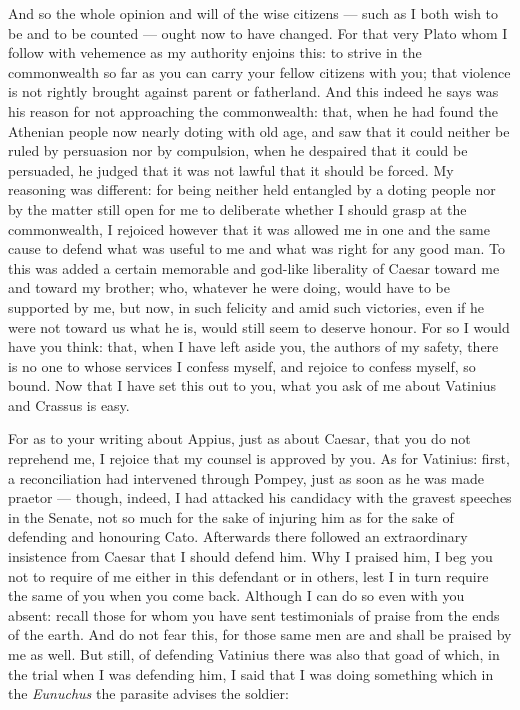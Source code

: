  And so the whole opinion and will of the wise citizens --- such as I both wish to be and to be counted --- ought now to have changed. For that very Plato whom I follow with vehemence as my authority enjoins this: to strive in the commonwealth so far as you can carry your fellow citizens with you; that violence is not rightly brought against parent or fatherland. And this indeed he says was his reason for not approaching the commonwealth: that, when he had found the Athenian people now nearly doting with old age, and saw that it could neither be ruled by persuasion nor by compulsion, when he despaired that it could be persuaded, he judged that it was not lawful that it should be forced. My reasoning was different: for being neither held entangled by a doting people nor by the matter still open for me to deliberate whether I should grasp at the commonwealth, I rejoiced however that it was allowed me in one and the same cause to defend what was useful to me and what was right for any good man. To this was added a certain memorable and god-like liberality of Caesar toward me and toward my brother; who, whatever he were doing, would have to be supported by me, but now, in such felicity and amid such victories, even if he were not toward us what he is, would still seem to deserve honour. For so I would have you think: that, when I have left aside you, the authors of my safety, there is no one to whose services I confess myself, and rejoice to confess myself, so bound. Now that I have set this out to you, what you ask of me about Vatinius and Crassus is easy.

 For as to your writing about Appius, just as about Caesar, that you do not reprehend me, I rejoice that my counsel is approved by you. As for Vatinius: first, a reconciliation had intervened through Pompey, just as soon as he was made praetor --- though, indeed, I had attacked his candidacy with the gravest speeches in the Senate, not so much for the sake of injuring him as for the sake of defending and honouring Cato. Afterwards there followed an extraordinary insistence from Caesar that I should defend him. Why I praised him, I beg you not to require of me either in this defendant or in others, lest I in turn require the same of you when you come back. Although I can do so even with you absent: recall those for whom you have sent testimonials of praise from the ends of the earth. And do not fear this, for those same men are and shall be praised by me as well. But still, of defending Vatinius there was also that goad of which, in the trial when I was defending him, I said that I was doing something which in the \textit{Eunuchus} the parasite advises the soldier:

